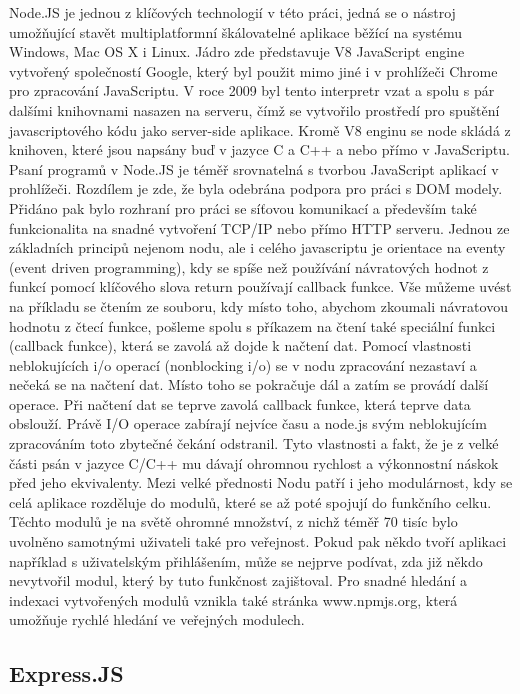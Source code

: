 \documentclass[thesis=M,czech]{FITthesis}[2012/06/26]
\begin{document}
Node.JS je jednou z klíčových technologií v této práci, jedná se o nástroj umožňující stavět multiplatformní škálovatelné aplikace běžící na systému Windows, Mac OS X i Linux. Jádro zde představuje V8 JavaScript engine vytvořený společností Google, který byl použit mimo jiné i v prohlížeči Chrome pro zpracování JavaScriptu. V roce 2009 byl tento interpretr vzat a spolu s pár dalšími knihovnami nasazen na serveru, čímž se vytvořilo prostředí pro spuštění javascriptového kódu jako server-side aplikace. Kromě V8 enginu se node skládá z knihoven, které jsou napsány buď v jazyce C a C++ a nebo přímo v JavaScriptu.
Psaní programů v Node.JS je téměř srovnatelná s tvorbou JavaScript aplikací v prohlížeči. Rozdílem je zde, že byla odebrána podpora pro práci s DOM modely. Přidáno pak bylo rozhraní pro práci se síťovou komunikací a především také funkcionalita na snadné vytvoření TCP/IP nebo přímo HTTP serveru.
Jednou ze základních principů nejenom nodu, ale i celého javascriptu je orientace na eventy (event driven programming), kdy se spíše než používání návratových hodnot z funkcí pomocí klíčového slova return používají callback funkce. Vše můžeme uvést na příkladu se čtením ze souboru, kdy místo toho, abychom zkoumali návratovou hodnotu z čtecí funkce, pošleme spolu s příkazem na čtení také speciální funkci (callback funkce), která se zavolá až dojde k načtení dat. Pomocí vlastnosti neblokujících i/o operací (nonblocking i/o) se v nodu zpracování nezastaví a nečeká se na načtení dat. Místo toho se pokračuje dál a zatím se provádí další operace. Při načtení dat se teprve zavolá callback funkce, která teprve data obslouží. Právě I/O operace zabírají nejvíce času a node.js svým neblokujícím zpracováním toto zbytečné čekání odstranil. Tyto vlastnosti a fakt, že je z velké části psán v jazyce C/C++ mu dávají ohromnou rychlost a výkonnostní náskok před jeho ekvivalenty.
Mezi velké přednosti Nodu patří i jeho modulárnost, kdy se celá aplikace rozděluje do modulů, které se až poté spojují do funkčního celku. Těchto modulů je na světě ohromné množství, z nichž téměř 70 tisíc bylo uvolněno samotnými uživateli také pro veřejnost. Pokud pak někdo tvoří aplikaci například s uživatelským přihlášením, může se nejprve podívat, zda již někdo nevytvořil modul, který by tuto funkčnost zajištoval. Pro snadné hledání a indexaci vytvořených modulů vznikla také stránka www.npmjs.org, která umožňuje rychlé hledání ve veřejných modulech.
    
    
\subsection{Express.JS}
\end{document}
